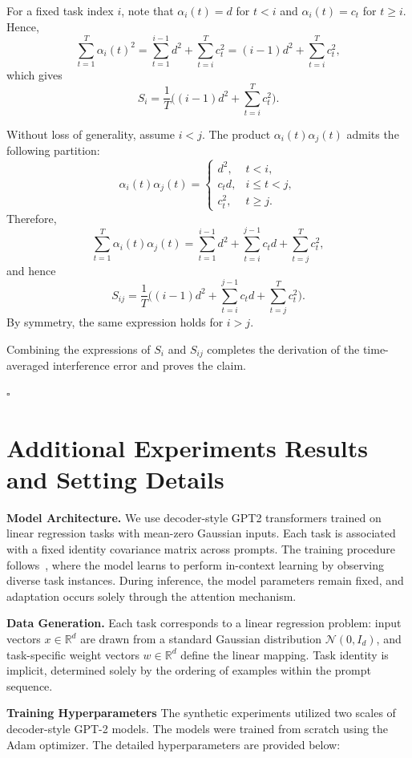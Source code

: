 \documentclass{article}
\theoremstyle{plain}
\theoremstyle{definition}
\theoremstyle{remark}
\begin{document}
For a fixed task index $i$, note that $\alpha_i(t)=d$ for $t<i$ and $\alpha_i(t)=c_t$ for $t\ge i$. Hence,
\[
\sum_{t=1}^T \alpha_i(t)^2
=
\sum_{t=1}^{i-1} d^2
+
\sum_{t=i}^T c_t^2
=
(i-1)d^2 + \sum_{t=i}^T c_t^2,
\]
which gives
\[
S_i
=
\frac{1}{T}\Big((i-1)d^2 + \sum_{t=i}^T c_t^2\Big).
\]

Without loss of generality, assume $i<j$. The product $\alpha_i(t)\alpha_j(t)$ admits the following partition:
\[
\alpha_i(t)\alpha_j(t)=
\begin{cases}
d^2, & t<i,\\[3pt]
c_t d, & i\le t<j,\\[3pt]
c_t^2, & t\ge j.
\end{cases}
\]
Therefore,
\[
\sum_{t=1}^T \alpha_i(t)\alpha_j(t)
=
\sum_{t=1}^{i-1} d^2
+
\sum_{t=i}^{j-1} c_t d
+
\sum_{t=j}^T c_t^2,
\]
and hence
\[
S_{ij}
=
\frac{1}{T}\Big(
(i-1)d^2
+
\sum_{t=i}^{j-1} c_t d
+
\sum_{t=j}^T c_t^2
\Big).
\]
By symmetry, the same expression holds for $i>j$.

Combining the expressions of $S_i$ and $S_{ij}$ completes the derivation of the time-averaged interference error and proves the claim.

\hfill$\square$

\vspace{-0.1in}\section{Additional Experiments Results and Setting Details}
\label{app:exp_details}
\noindent \textbf{Model Architecture.}
We use decoder-style GPT2 transformers trained on linear regression tasks with mean-zero Gaussian inputs. Each task is associated with a fixed identity covariance matrix across prompts. The training procedure follows~\citet{garg2022what}, where the model learns to perform in-context learning by observing diverse task instances. 
During inference, the model parameters remain fixed, and adaptation occurs solely through the attention mechanism.

\noindent \textbf{Data Generation.}
Each task corresponds to a linear regression problem: input vectors $x \in \mathbb{R}^d$ are drawn from a standard Gaussian distribution $\mathcal{N}(0, I_d)$, and task-specific weight vectors $w \in \mathbb{R}^d$ define the linear mapping. Task identity is implicit, determined solely by the ordering of examples within the prompt sequence.

\noindent \textbf{Training Hyperparameters}
The synthetic experiments utilized two scales of decoder-style GPT-2 models. The models were trained from scratch using the Adam optimizer. The detailed hyperparameters are provided below:
\end{document}
